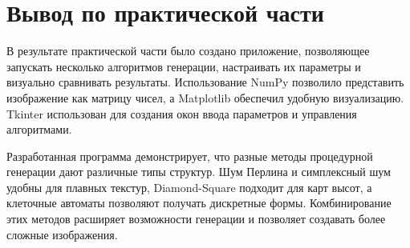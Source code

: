 \section{Вывод по практической части}

В результате практической части было создано приложение, позволяющее запускать несколько алгоритмов генерации, настраивать их параметры и визуально сравнивать результаты. Использование NumPy позволило представить изображение как матрицу чисел, а Matplotlib обеспечил удобную визуализацию. Tkinter использован для создания окон ввода параметров и управления алгоритмами.

Разработанная программа демонстрирует, что разные методы процедурной генерации дают различные типы структур. Шум Перлина и симплексный шум удобны для плавных текстур, Diamond-Square подходит для карт высот, а клеточные автоматы позволяют получать дискретные формы. Комбинирование этих методов расширяет возможности генерации и позволяет создавать более сложные изображения.
